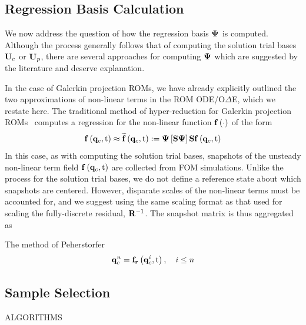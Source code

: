 \subsection{Regression Basis Calculation}\label{subsec:regBasis}
%
We now address the question of how the regression basis $\deimBasis$ is computed. Although the process generally follows that of computing the solution trial bases $\consTrial$ or $\primTrial$, there are several approaches for computing $\deimBasis$ which are suggested by the literature and deserve explanation.

In the case of Galerkin projection ROMs, we have already explicitly outlined the two approximations of non-linear terms in the ROM ODE/O$\Delta$E, which we restate here. The traditional method of hyper-reduction for Galerkin projection ROMs~\cite{Chaturantabut2010} computes a regression for the non-linear function $\mathbf{f} \left(\cdot\right)$ of the form
%
\begin{equation}
	\rhsFunc{\consVec, \timeVar} \approx \rhsApproxFunc{\consVec, \timeVar} \defEq \deimBasis \left[\sampMat \deimBasis \right] \sampMat \rhsFunc{\consVec, \timeVar}
\end{equation}
%
In this case, as with computing the solution trial bases, snapshots of the unsteady non-linear term field $\mathbf{f} \left(\mathbf{q}_{c}, \text{t}\right)$ are collected from FOM simulations. Unlike the process for the solution trial bases, we do not define a reference state about which snapshots are centered. However, disparate scales of the non-linear terms must be accounted for, and we suggest using the same scaling format as that used for scaling the fully-discrete residual, $\resScaleInv$. The snapshot matrix is thus aggregated as
%

%

The method of Peherstorfer~\cite{}
%
\begin{equation}
	\mathbf{q}_{c}^{n} = \mathbf{f}_{\mathbf{r}}\left(\mathbf{q}_{c}^{i}, \text{t}\right), \quad i \leq n
\end{equation}
%

\subsection{Sample Selection}

{\color{red} ALGORITHMS}

